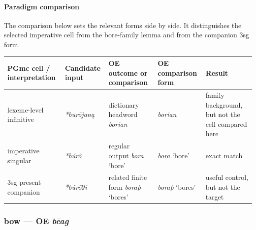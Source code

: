 \documentclass[
  british,
  a4paper,
]{article}
\newcounter{none} %
\begin{document}
\paragraph{Paradigm comparison}\label{paradigm-comparison-4}

The comparison below sets the relevant forms side by side. It
distinguishes the selected imperative cell from the bore-family lemma
and from the companion 3sg form.

{\def\LTcaptype{none} %
\begin{longtable}[]{@{}
  >{\raggedright\arraybackslash}p{}
  >{\raggedright\arraybackslash}p{}
  >{\raggedright\arraybackslash}p{}
  >{\raggedright\arraybackslash}p{}
  >{\raggedright\arraybackslash}p{}@{}}
\toprule\noalign{}
\begin{minipage}[b]{\linewidth}\raggedright
PGmc cell / interpretation
\end{minipage} & \begin{minipage}[b]{\linewidth}\raggedright
Candidate input
\end{minipage} & \begin{minipage}[b]{\linewidth}\raggedright
OE outcome or comparison
\end{minipage} & \begin{minipage}[b]{\linewidth}\raggedright
OE comparison form
\end{minipage} & \begin{minipage}[b]{\linewidth}\raggedright
Result
\end{minipage} \\
\midrule\noalign{}
\endhead
\bottomrule\noalign{}
\endlastfoot
lexeme-level infinitive & {\emph{*burōjaną}} & dictionary headword
{\emph{borian}} & {\emph{borian}} & family background, but not the cell
compared here \\
imperative singular & {\emph{*búrô}} & regular output {\emph{bora}}
`bore' & {\emph{bora}} `bore' & exact match \\
3sg present companion & {\emph{*búrōθi}} & related finite form
{\emph{boraþ}} `bores' & {\emph{boraþ}} `bores' & useful control, but
not the target \\
\end{longtable}
}

\subsubsection{\texorpdfstring{bow --- OE
\emph{bēag}}{bow --- OE bēag}}\label{bow-oe-bux113ag}
\end{document}
